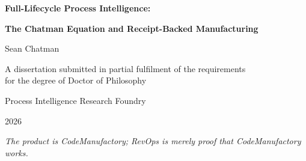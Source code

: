 \documentclass[12pt,a4paper]{report}
\begin{document}
\setcounter{page}{1}

\begin{titlepage}
  \centering
  \vspace*{2cm}
  {\LARGE\bfseries Full-Lifecycle Process Intelligence:\par}
  \vspace{0.5cm}
  {\Large\bfseries The Chatman Equation and Receipt-Backed Manufacturing\par}
  \vspace{2cm}
  {\large Sean Chatman\par}
  \vspace{1cm}
  {\normalsize
    A dissertation submitted in partial fulfilment of the requirements\\
    for the degree of Doctor of Philosophy\par
  }
  \vspace{1.5cm}
  {\normalsize Process Intelligence Research Foundry\par}
  \vspace{0.5cm}
  {\normalsize 2026\par}
  \vfill
  {\small
    \textit{The product is CodeManufactory; RevOps is merely proof that CodeManufactory works.}\par
  }
\end{titlepage}






\tableofcontents
\listoffigures
\listoftables

\clearpage

\setcounter{page}{1}















\end{document}
